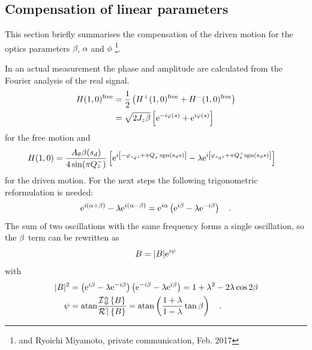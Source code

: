 \subsection{Compensation of linear parameters}
\label{sec_comp}

This section briefly summarises the compensation of the driven motion for the optics parameters
$\beta$, $\alpha$ and $\phi$ \footnote{\cite{Miyamoto2008} and Ryoichi Miyamoto, private communication, Feb. 2017}.

In an actual measurement the phase and amplitude are calculated from the Fourier analysis of the
real signal.
%
\begin{align}
   H(1,0)^\text{free} &= \frac{1}{2}\left( H^+(1,0)^\text{free} + H^-(1,0)^\text{free} \right)\notag \\
   &= \sqrt{2 J_z\beta} \left[ \text{e}^{-i\varphi(s) } + \text{e}^{i\varphi(s)} \right]
   \label{eq_four_real_free}
\end{align}
%
for the free motion and
%
\begin{align}
   H(1,0)
   &= \frac{A_\theta\beta(s_d)}{4\sin(\pi Q_z^-)}\left[
        \text{e}^{i\left[-\varphi_{s_ds} + \pi Q_z^-\text{sgn}(s_ds)\right]}
        -\lambda \text{e}^{i\left[\varphi_{s_ds} + \pi Q_z^+\text{sgn}(s_ds)\right]}
       \right]
       \label{eq_four_real_driven}
\end{align}
for the driven motion.
%
For the next steps the following trigonometric reformulation is needed:
%
\begin{equation}
  \text{e}^{i\left( \alpha + \beta \right)} - \lambda \text{e}^{i\left( \alpha - \beta \right)}
  = \text{e}^{i\alpha} \left(\text{e}^{i\beta} - \lambda\text{e}^{-i\beta}\right)
  \quad .
  \label{eq_e_alpha_lambda}
\end{equation}
%
The sum of two oscillations with the same frequency forms a single oscillation, so the $\beta$~term can
be rewritten as
%
\begin{equation}
  B = |B|\text{e}^{i\psi}
\end{equation}
with
%
\begin{align}
  |B|^2 &=  \left( \text{e}^{i\beta}-\lambda\text{e}^{-i\beta} \right)\left( \text{e}^{-i\beta} - \lambda\text{e}^{i\beta} \right)
  = 1+\lambda^2-2\lambda\cos{2\beta} \notag \\
  \psi&= \mathrm{atan} \frac{\mathcal{Im} \left\{ B \right\}}{\mathcal{Re} \left\{ B \right\}} = \mathrm{atan}\left(\frac{1+\lambda}{1-\lambda}\tan \beta\right)
  \quad .
\end{align}
